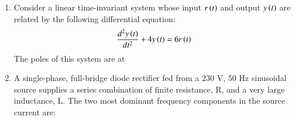 \documentclass[journal,12pt,onecolumn]{IEEEtran}
\theoremstyle{remark}
\begin{document}
\begin{enumerate}[start=1, label=Q.\arabic*]
\hfill{}

\item Consider a linear time-invariant system whose input $r\left(t\right)$ and output $y\left(t\right)$ are related by the following differential equation:
\begin{align*}
\frac{d^{2}y\left(t\right)}{dt^{2}}+4y\left(t\right)=6r\left(t\right)
\end{align*}
The poles of this system are at
    \begin{enumerate}
    \end{enumerate}

\hfill{}

\item A single-phase, full-bridge diode rectifier fed from a $230$ V, $50$ Hz sinusoidal source supplies a series combination of finite resistance, R, and a very large inductance, L. The two most dominant frequency components in the source current are:
    \begin{enumerate}
    \end{enumerate}

\hfill{}


\end{enumerate}
\end{document}
